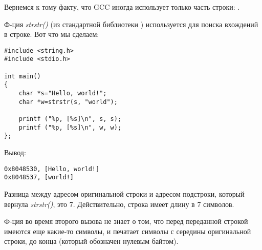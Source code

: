 \label{strstr_example}

Вернемся к тому факту, что GCC иногда использует только часть строки: .

Ф-ция \emph{strstr()} (из стандартной библиотеки \CCpp) используется для поиска вхождений в строке.
Вот что мы сделаем:

\begin{lstlisting}[style=customc]
#include <string.h>
#include <stdio.h>

int main()
{
	char *s="Hello, world!";
	char *w=strstr(s, "world");

	printf ("%p, [%s]\n", s, s);
	printf ("%p, [%s]\n", w, w);
};
\end{lstlisting}

Вывод:

\begin{lstlisting}
0x8048530, [Hello, world!]
0x8048537, [world!]
\end{lstlisting}

Разница между адресом оригинальной строки и адресом подстроки, который вернула \emph{strstr()}, это 7.
Действительно, строка  имеет длину в 7 символов.

Ф-ция \printf{} во время второго вызова не знает о том, что перед переданной строкой имеются еще какие-то символы,
и печатает символы с середины оригинальной строки, до конца (который обозначен нулевым байтом).

